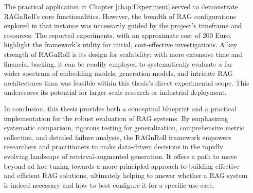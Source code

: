 The practical application in Chapter \ref{chap:Experiment} served to demonstrate RAGnRoll's core functionalities. However, the breadth of RAG configurations explored in that instance was necessarily guided by the project's timeframe and resources. The reported experiments, with an approximate cost of 200 Euro, highlight the framework's utility for initial, cost-effective investigations. A key strength of RAGnRoll is its design for scalability; with more extensive time and financial backing, it can be readily employed to systematically evaluate a far wider spectrum of embedding models, generation models, and intricate RAG architectures than was feasible within this thesis's direct experimental scope. This underscores its potential for larger-scale research or industrial deployment.

In conclusion, this thesis provides both a conceptual blueprint and a practical implementation for the robust evaluation of RAG systems. By emphasizing systematic comparison, rigorous testing for generalization, comprehensive metric collection, and detailed failure analysis, the RAGnRoll framework empowers researchers and practitioners to make data-driven decisions in the rapidly evolving landscape of retrieval-augmented generation. It offers a path to move beyond ad-hoc tuning towards a more principled approach to building effective and efficient RAG solutions, ultimately helping to answer whether a RAG system is indeed necessary and how to best configure it for a specific use-case.